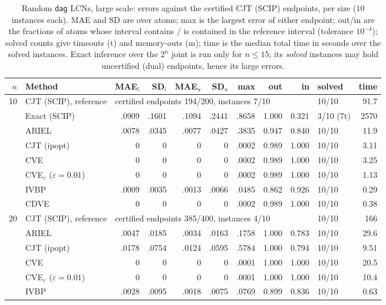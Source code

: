 \begin{table}[htbp]
\centering
\scriptsize
\caption{Random \texttt{dag} LCNs, large scale: errors against the certified CJT (SCIP) endpoints, per size ($10$ instances each). MAE and SD are over atoms; max is the largest error of either endpoint; out/in are the fractions of atoms whose interval contains / is contained in the reference interval (tolerance $10^{-4}$); solved counts give timeouts (t) and memory-outs (m); time is the median total time in seconds over the solved instances. Exact inference over the $2^n$ joint is run only for $n \le 15$; its \emph{solved} instances may hold uncertified (dual) endpoints, hence its large errors.}
\label{tab:full-dag-large}
\begin{tabular}{rlrrrrrrrlr}
\toprule
$n$ & Method & MAE$_l$ & SD$_l$ & MAE$_u$ & SD$_u$ & max & out & in & solved & time \\
\midrule
10 & CJT (SCIP), reference & \multicolumn{7}{l}{certified endpoints 194/200, instances 7/10} & 10/10 & 91.7 \\
 & Exact (SCIP) & .0909 & .1601 & .1094 & .2441 & .8658 & 1.000 & 0.321 & 3/10 (7t) & 2570 \\
 & ARIEL & .0078 & .0345 & .0077 & .0427 & .3835 & 0.947 & 0.840 & 10/10 & 11.9 \\
 & CJT (ipopt) & 0 & 0 & 0 & 0 & .0002 & 0.989 & 1.000 & 10/10 & 3.11 \\
 & CVE & 0 & 0 & 0 & 0 & .0002 & 0.989 & 1.000 & 10/10 & 3.25 \\
 & CVE$_\varepsilon$ ($\varepsilon{=}0.01$) & 0 & 0 & 0 & 0 & .0002 & 0.989 & 1.000 & 10/10 & 1.13 \\
 & IVBP & .0009 & .0035 & .0013 & .0066 & .0485 & 0.862 & 0.926 & 10/10 & 0.29 \\
 & CDVE & 0 & 0 & 0 & 0 & .0002 & 0.989 & 1.000 & 10/10 & 0.38 \\
\midrule
20 & CJT (SCIP), reference & \multicolumn{7}{l}{certified endpoints 385/400, instances 4/10} & 10/10 & 166 \\
 & ARIEL & .0047 & .0185 & .0034 & .0163 & .1758 & 1.000 & 0.783 & 10/10 & 29.6 \\
 & CJT (ipopt) & .0178 & .0754 & .0124 & .0595 & .5784 & 1.000 & 0.794 & 10/10 & 9.51 \\
 & CVE & 0 & 0 & 0 & 0 & .0001 & 1.000 & 1.000 & 10/10 & 20.5 \\
 & CVE$_\varepsilon$ ($\varepsilon{=}0.01$) & 0 & 0 & 0 & 0 & .0001 & 1.000 & 1.000 & 10/10 & 10.4 \\
 & IVBP & .0028 & .0095 & .0018 & .0075 & .0769 & 0.899 & 0.836 & 10/10 & 0.63 \\

\end{tabular}
\end{table}
